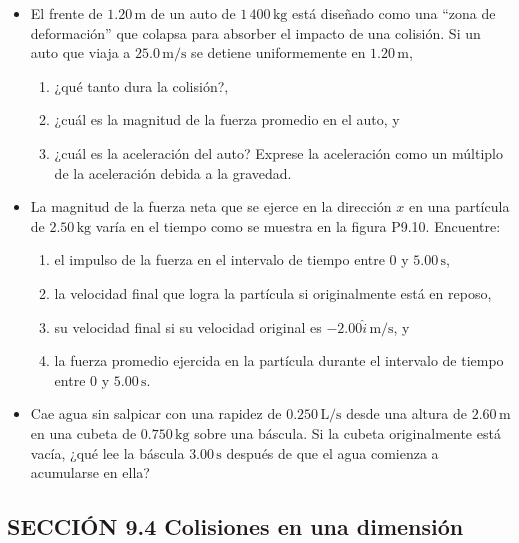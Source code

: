\documentclass[11pt,a4paper]{article}
\begin{document}
\newpage

\begin{itemize}
    \item[\textbf{9.}] El frente de \(1.20\,\text{m}\) de un auto de \(1\,400\,\text{kg}\) está diseñado como una “zona de deformación” que colapsa para absorber el impacto de una colisión. Si un auto que viaja a \(25.0\,\text{m/s}\) se detiene uniformemente en \(1.20\,\text{m}\),
    \begin{enumerate}
        \item ¿qué tanto dura la colisión?,
        \item ¿cuál es la magnitud de la fuerza promedio en el auto, y
        \item ¿cuál es la aceleración del auto? Exprese la aceleración como un múltiplo de la aceleración debida a la gravedad.
    \end{enumerate}
    \vspace*{6cm}

    \item[\textbf{10.}] La magnitud de la fuerza neta que se ejerce en la dirección \(x\) en una partícula de \(2.50\,\text{kg}\) varía en el tiempo como se muestra en la figura P9.10. Encuentre:
    \begin{enumerate}
        \item el impulso de la fuerza en el intervalo de tiempo entre \(0\) y \(5.00\,\text{s}\),
        \item la velocidad final que logra la partícula si originalmente está en reposo,
        \item su velocidad final si su velocidad original es \(-2.00\hat{i}\,\text{m/s}\), y
        \item la fuerza promedio ejercida en la partícula durante el intervalo de tiempo entre \(0\) y \(5.00\,\text{s}\).
    \end{enumerate}
    \vspace*{6cm}

    \item[\textbf{11.}] Cae agua sin salpicar con una rapidez de \(0.250\,\text{L/s}\) desde una altura de \(2.60\,\text{m}\) en una cubeta de \(0.750\,\text{kg}\) sobre una báscula. Si la cubeta originalmente está vacía, ¿qué lee la báscula \(3.00\,\text{s}\) después de que el agua comienza a acumularse en ella?
    \vspace*{6cm}
\end{itemize}

\newpage

\subsection*{SECCIÓN 9.4 Colisiones en una dimensión}
\end{document}
